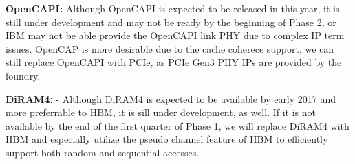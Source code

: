 \noindent
\textbf{OpenCAPI:} Although OpenCAPI is expected to be released in this year, it is still under development and may not be ready by the beginning of Phase 2, or IBM may not be able provide the OpenCAPI link PHY due to complex IP term issues.
OpenCAP is more desirable due to the cache coherece support, we can still replace OpenCAPI with PCIe, as PCIe Gen3 PHY IPs are provided by the foundry.

\vspace{3pt}
\noindent
\textbf{DiRAM4:} - Although DiRAM4 is expected to be available by early 2017 and more preferrable to HBM, it is sill under development, as well.
If it is not available by the end of the first quarter of Phase 1, we will replace DiRAM4 with HBM and especially utilize the pseudo channel feature of HBM to efficiently support both random and sequential accesses. 

